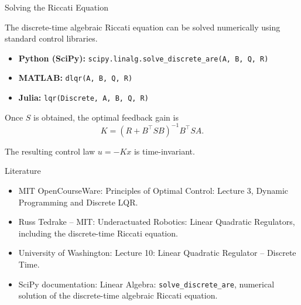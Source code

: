 \documentclass{beamer}
\begin{document}
\begin{frame}{Solving the Riccati Equation}
	\begin{flushleft}
		
		The discrete-time algebraic Riccati equation can be
		solved numerically using standard control libraries.
		
		\medskip
		
		\begin{itemize}
			\item \textbf{Python (SciPy):}
			\texttt{scipy.linalg.solve\_discrete\_are(A, B, Q, R)}
			
			\medskip
			
			\item \textbf{MATLAB:}
			\texttt{dlqr(A, B, Q, R)}
			
			\medskip
			
			\item \textbf{Julia:}
			\texttt{lqr(Discrete, A, B, Q, R)}
		\end{itemize}
		
		\medskip
		
		Once $S$ is obtained, the optimal feedback gain is
		\[
		K=(R+B^\top SB)^{-1}B^\top SA.
		\]
		
		The resulting control law $u=-Kx$ is time-invariant.
		
	\end{flushleft}
\end{frame}



\begin{frame}{Literature}
	\begin{itemize}
		
		\item MIT OpenCourseWare:
		{Principles of Optimal Control: Lecture 3, Dynamic Programming and Discrete LQR.}
		
		\item Russ Tedrake -- MIT:
		{Underactuated Robotics: Linear Quadratic Regulators, including the discrete-time Riccati equation.}
		
		\item University of Washington:
		{Lecture 10: Linear Quadratic Regulator -- Discrete Time.}
		
		\item SciPy documentation:
		{Linear Algebra: \texttt{solve\_discrete\_are}, numerical solution of the discrete-time algebraic Riccati equation.}
		
	\end{itemize}
\end{frame}





\myqrframe
\end{document}
